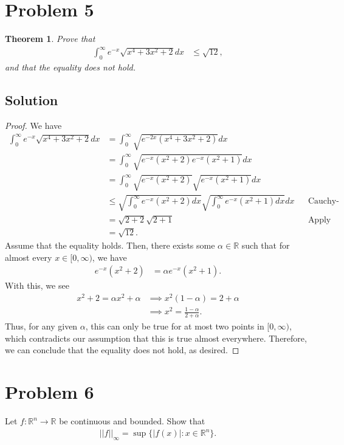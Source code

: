 \documentclass[10pt,a4paper]{article}
\theoremstyle{theorem}
\newtheorem{theorem}{Theorem}
\theoremstyle{definition}
\begin{document}
\section*{Problem 5}
\begin{theorem}
Prove that 
\begin{align*}
\int_0^\infty e^{-x} \sqrt{x^4 + 3x^2 + 2} dx &\leq \sqrt{12},
\end{align*}
and that the equality does not hold.
\end{theorem}

\subsection*{Solution}
\begin{proof}
We have
\begin{align*}
\int_0^\infty e^{-x} \sqrt{x^4 + 3x^2 + 2} dx &= \int_0^\infty \sqrt{e^{-2x}(x^4 + 3x^2 + 2)} dx\\
&= \int_0^\infty \sqrt{e^{-x}(x^2 + 2)e^{-x}(x^2 + 1)} dx\\
&= \int_0^\infty \sqrt{e^{-x}(x^2 + 2)} \sqrt{e^{-x}(x^2 + 1)} dx\\
&\leq \sqrt{ \int_0^\infty e^{-x}(x^2 + 2)dx} \sqrt{\int_0^\infty e^{-x}(x^2 + 1)dx} dx && \text{Cauchy-Schwarz's inequality}\\
&= \sqrt{ 2 + 2 } \sqrt{2 + 1} && \text{Apply integration by parts twice}\\
&= \sqrt{12}.
\end{align*}
Assume that the equality holds. Then, there exists some $\alpha \in \mathbb{R}$ such that for almost every $x \in [0, \infty)$, we have
\begin{align*}
e^{-x}(x^2 + 2) &= \alpha e^{-x}(x^2 + 1).
\end{align*}
With this, we see
\begin{align*}
x^2 + 2 = \alpha x^2 + \alpha &\implies x^2(1 - \alpha) = 2 + \alpha\\
&\implies x^2 = \frac{1 - \alpha}{2 + \alpha}.
\end{align*}
Thus, for any given $\alpha$, this can only be true for at most two points in $[0, \infty)$, which contradicts our assumption that this is true almost everywhere. Therefore, we can conclude that the equality does not hold, as desired.
\end{proof}

\section*{Problem 6}
Let $f: \mathbb{R}^n \to \mathbb{R}$ be continuous and bounded. Show that 
\begin{align*}
||f||_\infty = \sup \{|f(x)| : x \in \mathbb{R}^n \}.
\end{align*}
\end{document}
